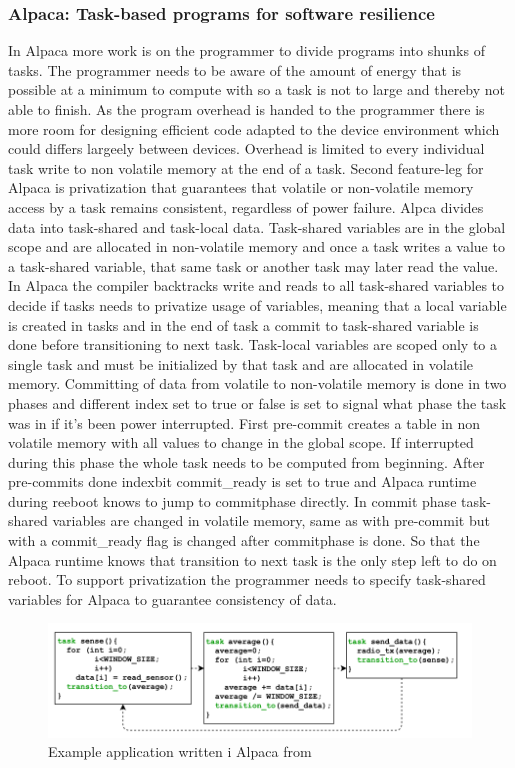 \documentclass[article,a4paper]{IEEEtran}
\begin{document}
\subsubsection{Alpaca: Task-based programs for software resilience}
In Alpaca more work is on the programmer to divide programs into shunks of tasks. The programmer needs to be aware of the amount of energy that is possible at a minimum to compute with so a task is not to large and thereby not able to finish. As the program overhead is handed to the programmer there is more room for designing efficient code adapted to the device environment which could differs largeely between devices. Overhead is limited to every individual task write to non volatile memory at the end of a task. Second feature-leg for Alpaca is privatization that guarantees that volatile or non-volatile memory access by a task remains consistent, regardless of power failure. Alpca divides data into task-shared and task-local data. Task-shared variables are in the global scope and are allocated in non-volatile memory and once a task writes a value to a task-shared variable, that same task or another task may later read the value. In Alpaca the compiler backtracks write and reads to all task-shared variables to decide if tasks needs to privatize usage of variables, meaning that a local variable is created in tasks and in the end of task a commit to task-shared variable is done before transitioning to next task. Task-local variables are scoped only to a single task and must be initialized by that task and are allocated in volatile memory. Committing of data from volatile to non-volatile memory is done in two phases and different index set to true or false is set to signal what phase the task was in if it's been power interrupted. First pre-commit creates a table in non volatile memory with all values to change in the global scope. If interrupted during this phase the whole task needs to be computed from beginning. After pre-commits done indexbit commit_ready is set to true and Alpaca runtime during reeboot knows to jump to commitphase directly. In commit phase task-shared variables are changed in volatile memory, same as with pre-commit but with a commit_ready flag is changed after commitphase is done. So that the Alpaca runtime knows that transition to next task is the only step left to do on reboot. To support privatization the programmer needs to specify task-shared variables for Alpaca to guarantee consistency of data.
\newline
\begin{figure}
    \includegraphics[width=\columnwidth]{Alpacatasksexample.png}
    \caption{ Example application written i Alpaca from \cite{Alpaca} }
    \label{fig2:_Alpaca_tasks }
\end{figure} 
\end{document}

